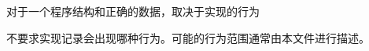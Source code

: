 对于一个\wellformed{}程序结构和正确的数据，取决于实现的行为

\begin{note}[\noindent]
不要求实现记录会出现哪种行为。可能的行为范围通常由本文件进行描述。
\end{note}

